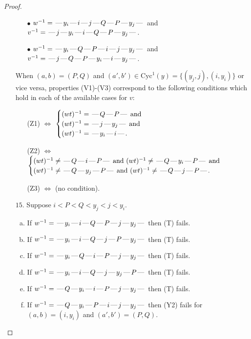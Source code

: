 \documentclass[10pt]{article}
\theoremstyle{definition}
\theoremstyle{definition}
\def\dash{\text{\hspace{0.5mm}---\hspace{0.5mm}}}
\def\Cyc{\mathrm{Cyc}}
\begin{document}
\begin{proof}
\begin{enumerate}
\begin{enumerate}
\item[$\bullet$] $w^{-1} = \dash y_i\dash i\dash j\dash Q\dash P\dash y_j\dash $ and $v^{-1} = \dash j\dash y_i\dash i\dash Q\dash P\dash y_j\dash $.
\item[$\bullet$] $w^{-1} = \dash y_i\dash Q\dash P\dash i\dash j\dash y_j\dash $ and $v^{-1} = \dash j\dash Q\dash P\dash y_i\dash i\dash y_j\dash $.
\end{enumerate}
When $(a,b)= (P,Q)$ and $(a',b')\in \Cyc^1(y)=\{(y_j,j),(i,y_i)\}$ or vice versa,
properties (V1)-(V3) correspond to the following conditions which hold in
each of the available cases for $v$:
\begin{enumerate}
\item[](Z1) $\Leftrightarrow$ $\begin{cases}\text{$(wt)^{-1} = \dash Q \dash P \dash$}\text{ and }\\
\text{$(wt)^{-1} = \dash j \dash y_j \dash$}\text{ and }\\
\text{$(wt)^{-1} = \dash y_i \dash i \dash$}.\end{cases}$
\item[](Z2) $\Leftrightarrow$ $\begin{cases}\text{$(wt)^{-1} \neq \dash Q \dash i \dash P \dash$ and $(wt)^{-1}\neq \dash Q \dash y_i \dash P \dash$}\text{ and }\\
\text{$(wt)^{-1} \neq \dash Q \dash y_j \dash P \dash$ and $(wt)^{-1}\neq \dash Q \dash j \dash P \dash$}.\end{cases}$
\item[](Z3) $\Leftrightarrow$ (no condition).
\end{enumerate}
\item[$15$.] Suppose $i < P < Q < y_j < j < y_i$.
\begin{enumerate}[(a)]
\item If $w^{-1} = \dash y_i\dash i\dash Q\dash P\dash j\dash y_j\dash $ then (T) fails.
\item If $w^{-1} = \dash y_i\dash i\dash Q\dash j\dash P\dash y_j\dash $ then (T) fails.
\item If $w^{-1} = \dash y_i\dash Q\dash i\dash P\dash j\dash y_j\dash $ then (T) fails.
\item If $w^{-1} = \dash y_i\dash i\dash Q\dash j\dash y_j\dash P\dash $ then (T) fails.
\item If $w^{-1} = \dash Q\dash y_i\dash i\dash P\dash j\dash y_j\dash $ then (T) fails.
\item If $w^{-1} = \dash Q\dash y_i\dash P\dash i\dash j\dash y_j\dash $ then (Y2) fails for $(a,b)=(i,y_i)$ and $(a',b')=(P,Q)$.

\end{enumerate}
\end{enumerate}
\end{proof}
\end{document}
